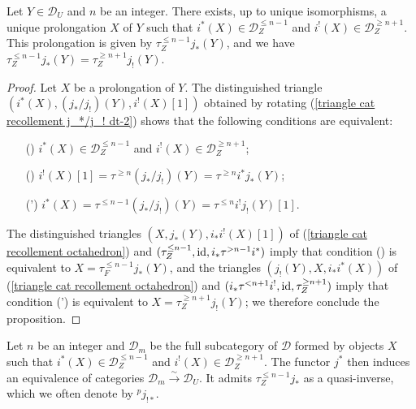 \begin{proposition}\label{triangle car recollement prolongation exist}
Let $Y\in\mathcal{D}_U$ and $n$ be an integer. There exists, up to unique isomorphisms, a unique prolongation $X$ of $Y$ such that $i^*(X)\in\mathcal{D}_Z^{\leq n-1}$ and $i^!(X)\in\mathcal{D}_Z^{\geq n+1}$. This prolongation is given by $\tau^{\leq n-1}_Zj_*(Y)$, and we have $\tau^{\leq n-1}_Zj_*(Y)=\tau^{\geq n+1}_Zj_!(Y)$.
\end{proposition}
\begin{proof}
Let $X$ be a prolongation of $Y$. The distinguished triangle $(i^*(X),(j_*/j_!)(Y),i^!(X)[1])$ obtained by rotating (\ref{triangle cat recollement j_*/j_! dt-2}) shows that the following conditions are equivalent:
\begin{enumerate}
    \item[(\rmnum{1})] $i^*(X)\in\mathcal{D}_Z^{\leq n-1}$ and $i^!(X)\in\mathcal{D}_Z^{\geq n+1}$;
    \item[(\rmnum{2})] $i^!(X)[1]=\tau^{\geq n}(j_*/j_!)(Y)=\tau^{\geq n}i^*j_*(Y)$;
    \item[(\rmnum{2}')] $i^*(X)=\tau^{\leq n-1}(j_*/j_!)(Y)=\tau^{\leq n}i^!j_!(Y)[1]$. 
\end{enumerate}
The distinguished triangles $(X,j_*(Y),i_*i^!(X)[1])$ of (\ref{triangle cat recollement octahedron}) and $(\tau^{\leq n-1}_Z,\operatorname{id},i_*\tau^{>n-1}i^*)$ imply that condition () is equivalent to $X=\tau^{\leq n-1}_Fj_*(Y)$, and the triangles $(j_!(Y),X,i_*i^*(X))$ of (\ref{triangle cat recollement octahedron}) and $(i_*\tau^{<n+1}i^!,\operatorname{id},\tau_Z^{\geq n+1})$ imply that condition (') is equivalent to $X=\tau_Z^{\geq n+1}j_!(Y)$; we therefore conclude the proposition.
\end{proof}

\begin{remark}
Let $n$ be an integer and $\mathcal{D}_m$ be the full subcategory of $\mathcal{D}$ formed by objects $X$ such that $i^*(X)\in\mathcal{D}_Z^{\leq n-1}$ and $i^!(X)\in\mathcal{D}_Z^{\geq n+1}$. The functor $j^*$ then induces an equivalence of categories $\mathcal{D}_m\stackrel{\sim}{\to}\mathcal{D}_U$. It admits $\tau^{\leq n-1}_Zj_*$ as a quasi-inverse, which we often denote by ${^pj_{!*}}$.
\end{remark}

